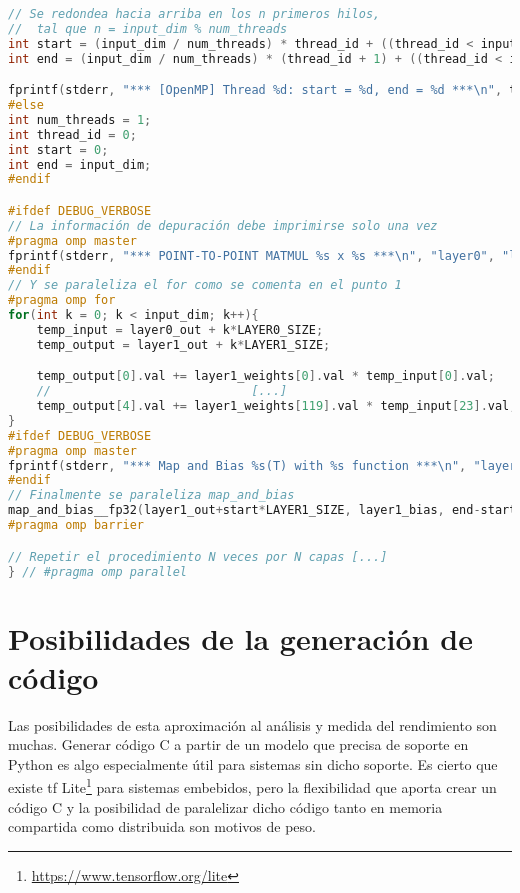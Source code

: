 \begin{enumerate}
\begin{lstlisting}[language=C]
// Se redondea hacia arriba en los n primeros hilos,
//  tal que n = input_dim % num_threads
int start = (input_dim / num_threads) * thread_id + ((thread_id < input_dim % num_threads) ? thread_id : input_dim % num_threads);
int end = (input_dim / num_threads) * (thread_id + 1) + ((thread_id < input_dim % num_threads) ? thread_id + 1 : input_dim % num_threads);

fprintf(stderr, "*** [OpenMP] Thread %d: start = %d, end = %d ***\n", thread_id, start, end);
#else
int num_threads = 1;
int thread_id = 0;
int start = 0;
int end = input_dim;
#endif

#ifdef DEBUG_VERBOSE
// La información de depuración debe imprimirse solo una vez
#pragma omp master
fprintf(stderr, "*** POINT-TO-POINT MATMUL %s x %s ***\n", "layer0", "layer1");
#endif
// Y se paraleliza el for como se comenta en el punto 1
#pragma omp for
for(int k = 0; k < input_dim; k++){
    temp_input = layer0_out + k*LAYER0_SIZE;
    temp_output = layer1_out + k*LAYER1_SIZE;

    temp_output[0].val += layer1_weights[0].val * temp_input[0].val;
    //                            [...]
    temp_output[4].val += layer1_weights[119].val * temp_input[23].val;
}
#ifdef DEBUG_VERBOSE
#pragma omp master
fprintf(stderr, "*** Map and Bias %s(T) with %s function ***\n", "layer1_out", "sigmoid__fp32");
#endif
// Finalmente se paraleliza map_and_bias
map_and_bias__fp32(layer1_out+start*LAYER1_SIZE, layer1_bias, end-start, LAYER1_SIZE, 'N', sigmoid__fp32);
#pragma omp barrier

// Repetir el procedimiento N veces por N capas [...]
} // #pragma omp parallel
\end{lstlisting}
\end{enumerate}

\section{Posibilidades de la generación de código}
\label{sec:posibilidades_de_la_generacion_de_codigo}
Las posibilidades de esta aproximación al análisis y medida del rendimiento son muchas. Generar código C a partir de un modelo que precisa de soporte en Python es algo especialmente útil para sistemas sin dicho soporte. Es cierto que existe \acrlong{tf} Lite\footnote{\url{https://www.tensorflow.org/lite}} para sistemas embebidos, pero la flexibilidad que aporta crear un código C y la posibilidad de paralelizar dicho código tanto en memoria compartida como distribuida son motivos de peso.

